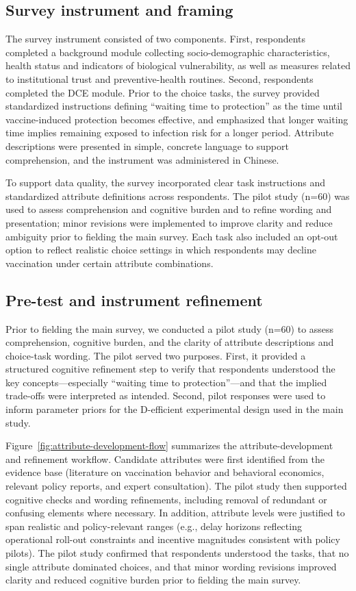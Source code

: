 \documentclass[doublespacing]{utdthesis}
\begin{document}
\subsection{Survey instrument and framing}
The survey instrument consisted of two components. First, respondents completed a background module collecting socio-demographic characteristics, health status and indicators of biological vulnerability, as well as measures related to institutional trust and preventive-health routines. Second, respondents completed the DCE module. Prior to the choice tasks, the survey provided standardized instructions defining ``waiting time to protection'' as the time until vaccine-induced protection becomes effective, and emphasized that longer waiting time implies remaining exposed to infection risk for a longer period. Attribute descriptions were presented in simple, concrete language to support comprehension, and the instrument was administered in Chinese.

To support data quality, the survey incorporated clear task instructions and standardized attribute definitions across respondents. The pilot study (n=60) was used to assess comprehension and cognitive burden and to refine wording and presentation; minor revisions were implemented to improve clarity and reduce ambiguity prior to fielding the main survey. Each task also included an opt-out option to reflect realistic choice settings in which respondents may decline vaccination under certain attribute combinations.

\subsection{Pre-test and instrument refinement}
\label{subsec:pretest_refinement}

Prior to fielding the main survey, we conducted a pilot study (n=60) to assess comprehension, cognitive burden, and the clarity of attribute descriptions and choice-task wording. The pilot served two purposes. First, it provided a structured cognitive refinement step to verify that respondents understood the key concepts---especially ``waiting time to protection''---and that the implied trade-offs were interpreted as intended. Second, pilot responses were used to inform parameter priors for the D-efficient experimental design used in the main study.

Figure~\ref{fig:attribute-development-flow} summarizes the attribute-development and refinement workflow. Candidate attributes were first identified from the evidence base (literature on vaccination behavior and behavioral economics, relevant policy reports, and expert consultation). The pilot study then supported cognitive checks and wording refinements, including removal of redundant or confusing elements where necessary. In addition, attribute levels were justified to span realistic and policy-relevant ranges (e.g., delay horizons reflecting operational roll-out constraints and incentive magnitudes consistent with policy pilots). The pilot study confirmed that respondents understood the tasks, that no single attribute dominated choices, and that minor wording revisions improved clarity and reduced cognitive burden prior to fielding the main survey.
\end{document}
